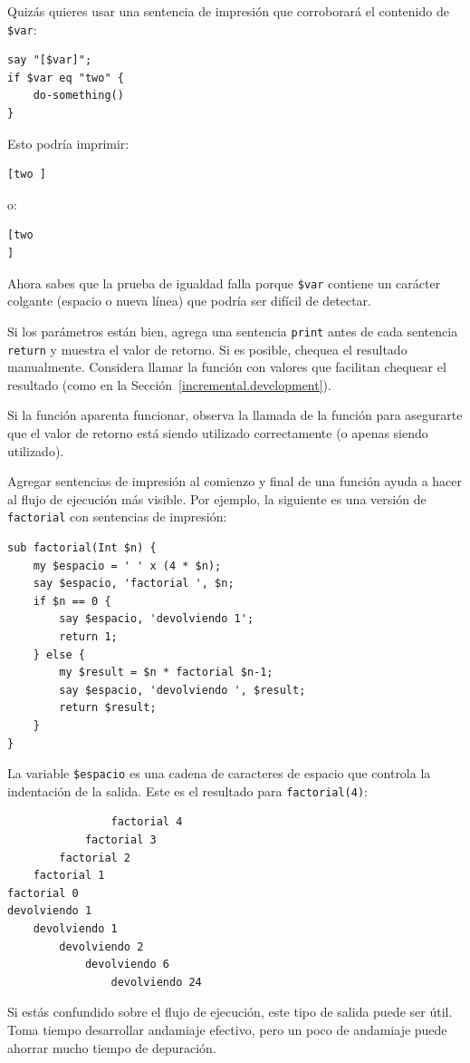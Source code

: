 Quizás quieres usar una sentencia de impresión que 
corroborará el contenido de \verb|$var|:
\begin{verbatim}
say "[$var]";
if $var eq "two" {
    do-something()
}
\end{verbatim}
%

Esto podría imprimir:
\begin{verbatim}
[two ]
\end{verbatim}
%

o:
\begin{verbatim}
[two
]
\end{verbatim}
%
Ahora sabes que la prueba de igualdad falla porque 
\verb|$var| contiene un carácter colgante (espacio o nueva línea)
que podría ser difícil de detectar.

Si los parámetros están bien, agrega una sentencia {\tt print}
antes de cada sentencia {\tt return} y muestra el valor de retorno.
Si es posible, chequea el resultado manualmente. Considera llamar 
la función con valores que facilitan chequear el resultado
(como en la Sección~\ref{incremental.development}).

Si la función aparenta funcionar, observa la llamada de la función
para asegurarte que el valor de retorno está siendo utilizado 
correctamente (o apenas siendo utilizado).

Agregar sentencias de impresión al comienzo y final de una función
ayuda a hacer al flujo de ejecución más visible. 
Por ejemplo, la siguiente es una versión de {\tt factorial}
con sentencias de impresión:

\begin{verbatim}
sub factorial(Int $n) {
    my $espacio = ' ' x (4 * $n);
    say $espacio, 'factorial ', $n;
    if $n == 0 {
        say $espacio, 'devolviendo 1';
        return 1;
    } else {
        my $result = $n * factorial $n-1;
        say $espacio, 'devolviendo ', $result;
        return $result;
    }
}
\end{verbatim}
%
La variable {\tt \$espacio} es una cadena de caracteres de espacio que 
controla la indentación de la salida. Este es el resultado para 
{\tt factorial(4)}:

\begin{verbatim}
                factorial 4
            factorial 3
        factorial 2
    factorial 1
factorial 0
devolviendo 1
    devolviendo 1
        devolviendo 2
            devolviendo 6
                devolviendo 24
\end{verbatim}
%
Si estás confundido sobre el flujo de ejecución, este tipo
de salida puede ser útil. Toma tiempo desarrollar andamiaje 
efectivo, pero un poco de andamiaje puede ahorrar mucho 
tiempo de depuración.

